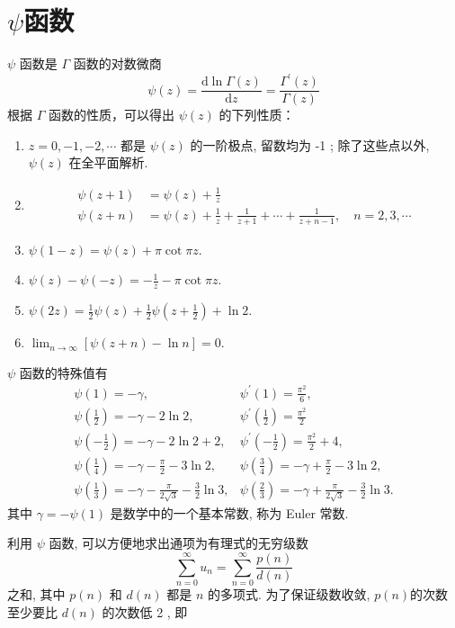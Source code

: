\section{$\psi$函数}
$\psi$ 函数是 $\Gamma$ 函数的对数微商
\begin{equation}
    \psi(z)=\frac{\mathrm{d} \ln \Gamma(z)}{\mathrm{d} z}=\frac{\Gamma^{\prime}(z)}{\Gamma(z)}
\end{equation}
根据 $\Gamma$ 函数的性质，可以得出 $\psi(z)$ 的下列性质：

\begin{enumerate}
    \item $z=0,-1,-2, \cdots$ 都是 $\psi(z)$ 的一阶极点, 留数均为 -1 ; 除了这些点以外, $\psi(z)$ 在全平面解析.
    \item $$
    \begin{aligned}
    \psi(z+1) & =\psi(z)+\frac{1}{z} \\
    \psi(z+n) & =\psi(z)+\frac{1}{z}+\frac{1}{z+1}+\cdots+\frac{1}{z+n-1}, \quad n=2,3, \cdots
    \end{aligned}
    $$
    \item   $\psi(1-z)=\psi(z)+\pi \cot \pi z$.
    \item  $\psi(z)-\psi(-z)=-\frac{1}{z}-\pi \cot \pi z$.
    \item  $\psi(2 z)=\frac{1}{2} \psi(z)+\frac{1}{2} \psi\left(z+\frac{1}{2}\right)+\ln 2$.
    \item  $\lim _{n \rightarrow \infty}[\psi(z+n)-\ln n]=0$.
\end{enumerate}

$\psi$ 函数的特殊值有
$$
\begin{array}{ll}
\psi(1)=-\gamma, & \psi^{\prime}(1)=\frac{\pi^{2}}{6}, \\
\psi\left(\frac{1}{2}\right)=-\gamma-2 \ln 2, & \psi^{\prime}\left(\frac{1}{2}\right)=\frac{\pi^{2}}{2} \\
\psi\left(-\frac{1}{2}\right)=-\gamma-2 \ln 2+2, & \psi^{\prime}\left(-\frac{1}{2}\right)=\frac{\pi^{2}}{2}+4, \\
\psi\left(\frac{1}{4}\right)=-\gamma-\frac{\pi}{2}-3 \ln 2, & \psi\left(\frac{3}{4}\right)=-\gamma+\frac{\pi}{2}-3 \ln 2, \\
\psi\left(\frac{1}{3}\right)=-\gamma-\frac{\pi}{2 \sqrt{3}}-\frac{3}{2} \ln 3, & \psi\left(\frac{2}{3}\right)=-\gamma+\frac{\pi}{2 \sqrt{3}}-\frac{3}{2} \ln 3 .
\end{array}
$$
其中 $\gamma=-\psi(1)$ 是数学中的一个基本常数, 称为 Euler 常数.


利用 $\psi$ 函数, 可以方便地求出通项为有理式的无穷级数
$$
\sum_{n=0}^{\infty} u_{n}=\sum_{n=0}^{\infty} \frac{p(n)}{d(n)}
$$
之和, 其中 $p(n)$ 和 $d(n)$ 都是 $n$ 的多项式. 为了保证级数收敛, $p(n)$的次数至少要比 $d(n)$ 的次数低 2 , 即

